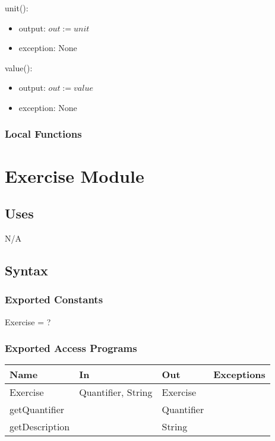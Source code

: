 \documentclass[12pt, titlepage]{article}
\begin{document}
unit():
\begin{itemize}
	\item output: $out := unit$
	\item exception: None
\end{itemize}

value():
\begin{itemize}
	\item output: $out := value$
	\item exception: None
\end{itemize}

\subsubsection{Local Functions}


\newpage

\section{Exercise Module}

\subsection{Uses}
N/A

\subsection{Syntax}

\subsubsection{Exported Constants}
Exercise = ?
\subsubsection{Exported Access Programs}

\begin{center}
	\begin{tabular}{p{2cm} p{4cm} p{4cm} p{2cm}}
		\hline
		\textbf{Name} & \textbf{In} & \textbf{Out} & \textbf{Exceptions} \\
		\hline
		Exercise & Quantifier, String & Exercise &  \\
		getQuantifier &  & Quantifier &  \\
		getDescription & & String & \\
		\hline
	\end{tabular}
\end{center}
\end{document}
